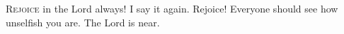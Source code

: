 \lettrine[loversize=0.15,lines=2]{R}{ejoice} in the Lord always! I say it again. Rejoice! Everyone should see how unselfish you are. The Lord is near.
